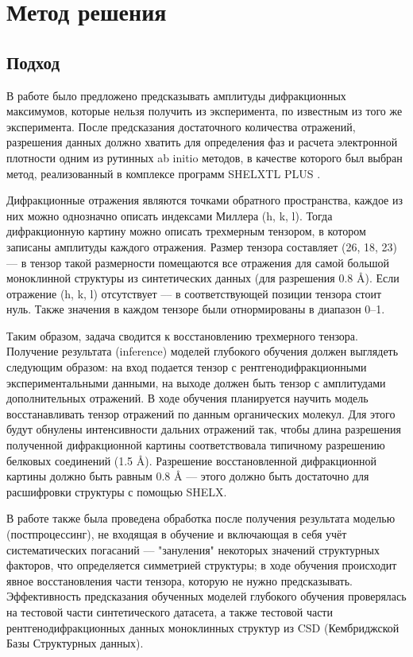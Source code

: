 \section{Метод решения}

\subsection{Подход}

В работе было предложено предсказывать амплитуды дифракционных максимумов, которые нельзя получить из эксперимента, по известным из того же эксперимента. После предсказания достаточного количества отражений, разрешения данных должно хватить для определения фаз и расчета электронной плотности одним из рутинных ab initio методов, в качестве которого был выбран метод, реализованный в комплексе программ SHELXTL PLUS \cite{sheldrick_shelxt_2015}.

Дифракционные отражения являются точками обратного пространства, каждое из них можно однозначно описать индексами Миллера (h, k, l). Тогда дифракционную картину можно описать трехмерным тензором, в котором записаны амплитуды каждого отражения. Размер тензора составляет (26, 18, 23) --- в тензор такой размерности помещаются все отражения для самой большой моноклинной структуры из синтетических данных (для разрешения 0.8 \r{A}). Если отражение (h, k, l) отсутствует --– в соответствующей позиции тензора стоит нуль. Также значения в каждом тензоре были отнормированы в диапазон 0--1.

Таким образом, задача сводится к восстановлению трехмерного тензора. Получение результата (inference) моделей глубокого обучения должен выглядеть следующим образом: на вход подается тензор с рентгенодифракционными экспериментальными данными, на выходе должен быть тензор с амплитудами дополнительных отражений. В ходе обучения планируется научить модель восстанавливать тензор отражений по данным органических молекул. Для этого будут обнулены интенсивности дальних отражений так, чтобы длина разрешения полученной дифракционной картины соответствовала типичному разрешению белковых соединений (1.5 \r{A}). Разрешение восстановленной дифракционной картины должно быть равным 0.8 \r{A} --- этого должно быть достаточно для расшифровки структуры с помощью SHELX.

В работе также была проведена обработка после получения результата моделью (постпроцессинг), не входящая в обучение и включающая в себя учёт систематических погасаний --- "зануления" некоторых значений структурных факторов, что определяется симметрией структуры; в ходе обучения происходит явное восстановления части тензора, которую не нужно предсказывать.
Эффективность предсказания обученных моделей глубокого обучения проверялась на тестовой части синтетического датасета, а также тестовой части рентгенодифракционных данных моноклинных структур из CSD (Кембриджской Базы Структурных данных).

